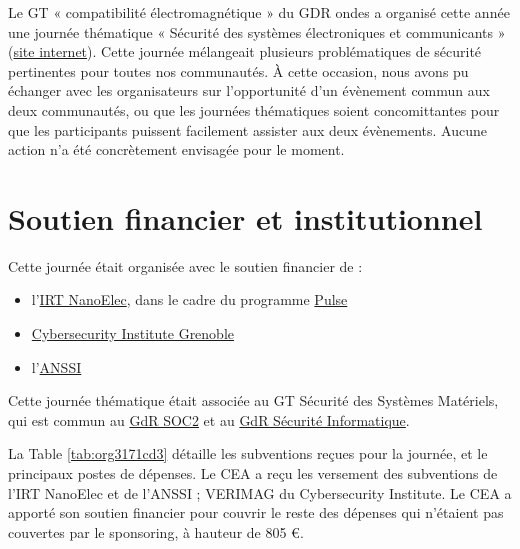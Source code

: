 \documentclass[a4paper,11pt]{article}
\begin{document}
Le GT « compatibilité électromagnétique » du GDR ondes a organisé
cette année une journée thématique « Sécurité des systèmes
électroniques et communicants » (\href{http://gdr-ondes.cnrs.fr/2019/02/14/journee-thematique-securite-des-systemes-electroniques-et-communicants-21-mai-2019-paris-jussieu}{site internet}).  Cette journée
mélangeait plusieurs problématiques de sécurité pertinentes pour
toutes nos communautés.  À cette occasion, nous avons pu échanger avec
les organisateurs sur l'opportunité d'un évènement commun aux deux
communautés, ou que les journées thématiques soient concomittantes
pour que les participants puissent facilement assister aux deux
évènements.  Aucune action n'a été concrètement envisagée pour le
moment.

\section{Soutien financier et institutionnel}
\label{sec:org79ae553}

Cette journée était organisée avec le soutien financier de :

\begin{itemize}
\item l'\href{http://www.irtnanoelec.fr}{IRT NanoElec}, dans le cadre du programme \href{http://www.irtnanoelec.fr/technologies-de-liaison}{Pulse}
\item \href{https://cybersecurity.univ-grenoble-alpes.fr/}{Cybersecurity Institute Grenoble}
\item l'\href{https://www.ssi.gouv.fr}{ANSSI}
\end{itemize}

Cette journée thématique était associée au GT Sécurité des Systèmes
Matériels, qui est commun au \href{http://www.gdr-soc.cnrs.fr}{GdR SOC2} et au \href{https://gdr-securite.irisa.fr}{GdR Sécurité Informatique}.

La Table \ref{tab:org3171cd3} détaille les subventions reçues pour la journée,
et le principaux postes de dépenses.
Le CEA a reçu les versement des subventions de l'IRT NanoElec et de
l'ANSSI ; VERIMAG du Cybersecurity Institute.  Le CEA a apporté son
soutien financier pour couvrir le reste des dépenses qui n'étaient pas
couvertes par le sponsoring, à hauteur de 805 €.
\end{document}
